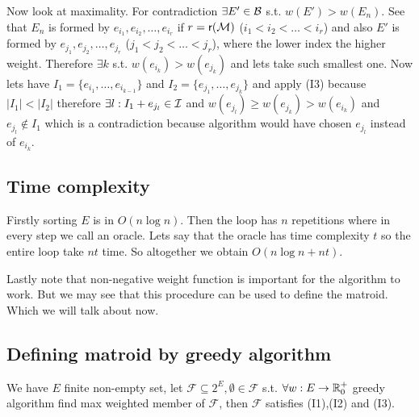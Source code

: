 Now look at maximality. For contradiction $\exists E' \in \mathcal{B}$ s.t. $w(E') > w(E_n)$. See that $E_n$ is formed by $e_{i_1}, e_{i_2}, \dots, e_{i_r}$ if $r = \operatorname{\textsf{r}} (\mathcal{M})$ ($i_1 < i_2 < \dots < i_r$) and also $E'$ is formed by $e_{j_1}, e_{j_2}, \dots, e_{j_r}$ ($j_1 < j_2 < \dots < j_r$), where the lower index the higher weight. Therefore $\exists k$ s.t. $w(e_{i_k}) > w(e_{j_k})$ and lets take such smallest one. Now lets have $I_1 = \{e_{i_1}, \dots, e_{i_{k-1}}\}$ and $I_2 = \{e_{j_{1}}, \dots, e_{j_k}\}$ and apply (I3) because $|I_1| < |I_2|$ therefore $\exists l : I_1 + e_{j_l} \in \mathcal{I}$ and $w(e_{j_l}) \geq w(e_{j_k}) > w(e_{i_k})$ and $e_{j_l} \notin I_1$ which is a contradiction because algorithm would have chosen $e_{j_l}$ instead of $e_{i_k}$.

\subsection{Time complexity}

Firstly sorting $E$ is in $O(n \log n)$. Then the loop has $n$ repetitions where in every step we call an oracle. Lets say that the oracle has time complexity $t$ so the entire loop take $nt$ time. So altogether we obtain $O(n \log n + nt)$.

Lastly note that non-negative weight function is important for the algorithm to work. But we may see that this procedure can be used to define the matroid. Which we will talk about now.

\subsection{Defining matroid by greedy algorithm}

\begin{prop}
	We have $E$ finite non-empty set, let $\mathcal{F} \subseteq 2^E,\emptyset \in \mathcal{F}$ s.t. $\forall w : E \to \mathbb{R}_0^+$ greedy algorithm find max weighted member of $\mathcal{F}$, then $\mathcal{F}$ satisfies (I1),(I2) and (I3).
\end{prop}

